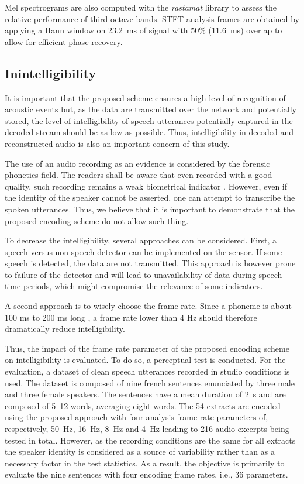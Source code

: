 \documentclass[sensors,article,accept,moreauthors,pdftex,10pt,a4paper]{mdpi}
\begin{document}
Mel spectrograms are also computed with the \textit{rastamat} library \cite{ellis2005} to assess the relative performance of third-octave bands. STFT analysis frames are obtained by applying a Hann window on 23.2~ms of signal with 50\% (11.6~ms) overlap to allow for efficient phase recovery.

\subsection{Inintelligibility} \label{sec:inintelligibility_p}

It is important that the proposed scheme ensures a high level of recognition of acoustic events but, as the data {are} transmitted over the network and potentially stored, the level of intelligibility of  speech utterances potentially captured in the decoded stream should be as low as possible. Thus, intelligibility in decoded and reconstructed audio is also an important concern of this study.

The use of an audio recording as an evidence is considered by the forensic phonetics \cite{baldwin1990forensic} field. The readers shall be aware that even recorded with a good quality, such recording remains a weak biometrical indicator \cite{boe2000forensic}. {However}, even if the identity of the speaker cannot be asserted, one can attempt to transcribe the spoken utterances. {Thus}, we believe that it is important to demonstrate that the proposed encoding scheme do not allow such thing.

{To} decrease the intelligibility, several approaches can be considered. First, a speech versus non speech detector can be implemented on the sensor. If some speech is detected, the data {are} not transmitted. This approach is however prone to failure of the detector and will lead to unavailability of data during speech time {periods,} which might compromise the relevance of some indicators.

A second approach is to wisely choose the frame rate. Since a phoneme is about 100 ms to 200 ms long \cite{kuwabara1996acoustic,rosen1992temporal}, a frame rate lower than 4 Hz should therefore dramatically reduce intelligibility.

Thus, the impact of the frame rate parameter of the proposed encoding scheme on intelligibility is evaluated. To do so, a perceptual test is conducted. For the evaluation, a dataset of clean speech utterances recorded in studio conditions is used. The dataset is composed of {nine} french sentences enunciated by {three} male and {three} female speakers. The sentences have a mean duration of $2$~s and are composed of {5--12} words, averaging {eight words}. The 54 extracts are encoded using the proposed approach with {four} analysis frame rate parameters {of,  respectively,} 50~Hz, 16~Hz, 8~Hz and 4~Hz leading to 216 audio excerpts being tested in total. However, as the recording conditions are the same for all extracts the speaker identity is considered as a source of variability rather than as a necessary factor in the test statistics. As a {result,} the objective is primarily to evaluate the {nine} sentences with {four} encoding frame rates, i.e., 36 parameters.
\end{document}
